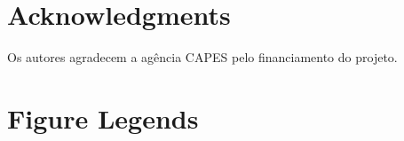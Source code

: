 \documentclass[10pt]{article}
\begin{document}
\section*{Acknowledgments}
Os autores agradecem a ag{\^e}ncia CAPES pelo financiamento do projeto.




\section*{Figure Legends}


\end{document}
